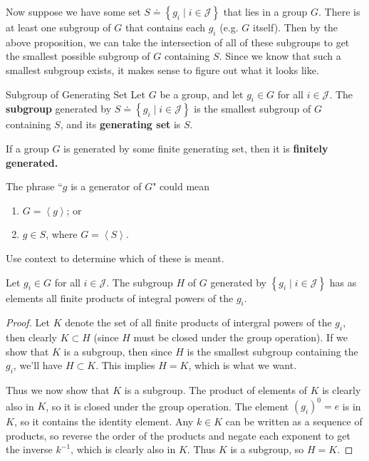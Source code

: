 \documentclass[10pt]{report}
\begin{document}
Now suppose we have some set $S \doteq \left\{ g_i \;|\; i \in \mathcal{J}\right\}$ that lies in a group $G$. There is at least one subgroup of $G$ that contains each $g_i$ (e.g. $G$ itself). Then by the above proposition, we can take the intersection of all of these subgroups to get the smallest possible subgroup of $G$ containing $S$. Since we know that such a smallest subgroup exists, it makes sense to figure out what it looks like.

\begin{defn}{Subgroup of Generating Set}{}
	Let $G$ be a group, and let $g_i \in G$ for all $i \in \mathcal{J}$. The \textbf{subgroup} generated by $S \doteq \left\{ g_i \;|\; i \in \mathcal{J} \right\}$ is the smallest subgroup of $G$ containing $S$, and its \textbf{generating set} is $S$.

If  a group $G$ is generated by some finite generating set, then it is \textbf{finitely generated.} 
\end{defn}

\begin{note}{}{}
The phrase ``$g$ is a generator of $G$" could mean
\begin{enumerate}
	\item $G = \left\langle g \right\rangle$; or
	\item $g \in S$, where $G = \left\langle S \right\rangle$.
\end{enumerate}
Use context to determine which of these is meant.
\end{note}

\begin{thrm}{}{}
	Let $g_i \in G$ for all $i \in \mathcal{J}$. The subgroup $H$ of $G$ generated by $\left\{ g_i \;|\; i \in \mathcal{J} \right\}$ has as elements all finite products of integral powers of the $g_i$.
\end{thrm}
\begin{proof}
	Let $K$ denote the set of all finite products of intergral powers of the $g_i$, then clearly $K \subset H$ (since $H$ must be closed under the group operation). If we show that $K$ is a subgroup, then since $H$ is the smallest subgroup containing the $g_i$, we'll have $H \subset K$. This implies $H=K$, which is what we want.

	Thus we now show that $K$ is a subgroup. The product of elements of $K$ is clearly also in $K$, so it is closed under the group operation. The element $(g_i)^0 = e$ is in $K$, so it contains the identity element. Any $k \in K$ can be written as a sequence of products, so reverse the order of the products and negate each exponent to get the inverse $k^{-1}$, which is clearly also in $K$. Thus $K$ is a subgroup, so $H=K$.
\end{proof}
\end{document}
